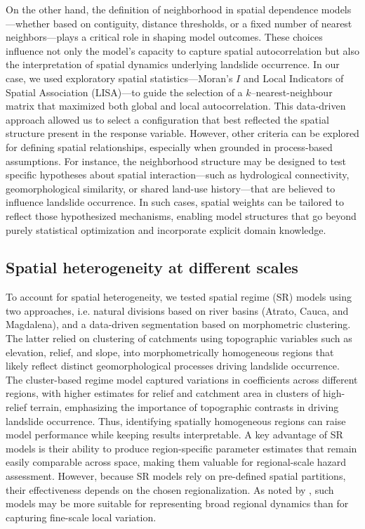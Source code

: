 \documentclass[lineno,pdflatex,sn-basic]{sn-jnl}%
\theoremstyle{thmstyleone}%
\theoremstyle{thmstyletwo}%
\theoremstyle{thmstylethree}%
\begin{document}
On the other hand, the definition of neighborhood in spatial dependence models—whether based on contiguity, distance thresholds, or a fixed number of nearest neighbors—plays a critical role in shaping model outcomes. These choices influence not only the model’s capacity to capture spatial autocorrelation but also the interpretation of spatial dynamics underlying landslide occurrence. In our case, we used exploratory spatial statistics—Moran’s $I$ and Local Indicators of Spatial Association (LISA)—to guide the selection of a $k$–nearest-neighbour matrix that maximized both global and local autocorrelation. This data-driven approach allowed us to select a configuration that best reflected the spatial structure present in the response variable. However, other criteria can be explored for defining spatial relationships, especially when grounded in process-based assumptions. For instance, the neighborhood structure may be designed to test specific hypotheses about spatial interaction—such as hydrological connectivity, geomorphological similarity, or shared land-use history—that are believed to influence landslide occurrence. In such cases, spatial weights can be tailored to reflect those hypothesized mechanisms, enabling model structures that go beyond purely statistical optimization and incorporate explicit domain knowledge.

\subsection{Spatial heterogeneity at different scales}

To account for spatial heterogeneity, we tested spatial regime (SR) models using two approaches, i.e. natural divisions based on river basins (Atrato, Cauca, and Magdalena), and a data-driven segmentation based on morphometric clustering. 
The latter relied on clustering of catchments using topographic variables such as elevation, relief, and slope, into morphometrically homogeneous regions that likely reflect distinct geomorphological processes driving landslide occurrence.
The cluster-based regime model captured variations in coefficients across different regions, with higher estimates for relief and catchment area in clusters of high-relief terrain, emphasizing the importance of topographic contrasts in driving landslide occurrence.
Thus, identifying spatially homogeneous regions can raise model performance while keeping results interpretable. 
A key advantage of SR models is their ability to produce region-specific parameter estimates that remain easily comparable across space, making them valuable for regional-scale hazard assessment. However, because SR models rely on pre-defined spatial partitions, their effectiveness depends on the chosen regionalization. As noted by \cite{wolf2018single}, such models may be more suitable for representing broad regional dynamics than for capturing fine-scale local variation.
\end{document}
